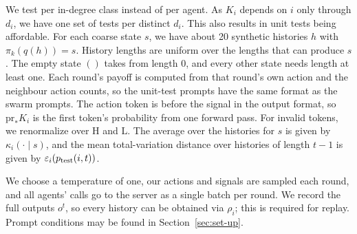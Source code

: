 We test per in-degree class instead of per agent.
As $K_i$ depends on $i$ only through $d_i$, we have one set of tests per distinct $d_i$.
This also results in unit tests being affordable.
For each coarse state $s$, we have about 20 synthetic histories $h$ with $\pi_k(q(h)) = s$.
History lengths are uniform over the lengths that can produce $s$.
The empty state $()$ takes from length $0$, and every other state needs length at least one.
Each round's payoff is computed from that round's own action and the neighbour action counts, so the unit-test prompts have the same format as the swarm prompts.
The action token is before the signal in the output format, so $\mathrm{pr}_* K_i$ is the first token's probability from one forward pass.
For invalid tokens, we renormalize over $\mathrm{H}$ and $\mathrm{L}$.
The average over the histories for $s$ is given by $\kappa_i(\cdot \mid s)$, and the mean total-variation distance over histories of length $t-1$ is given by $\varepsilon_i(p_{\mathrm{test}}(i,t))$.


We choose a temperature of one, our actions and signals are sampled each round, and all agents' calls go to the server as a single batch per round.
We record the full outputs $o^t$, so every history can be obtained via $\rho_i$; this is required for replay.
Prompt conditions may be found in Section~\ref{sec:set-up}.

